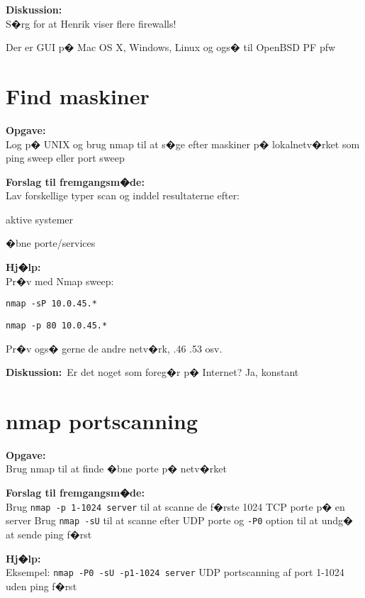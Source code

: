 \documentclass[a4paper,11pt,notitlepage]{oevelser}
\begin{document}
{\bfseries Diskussion:}\\
S�rg for at Henrik viser flere firewalls!

Der er GUI p� Mac OS X, Windows, Linux og ogs� til OpenBSD PF pfw




\chapter{Find maskiner}
\label{ex:nmap-sweep}

{\bfseries Opgave:}\\
Log p� UNIX og brug nmap til at s�ge efter maskiner p� lokalnetv�rket som ping sweep eller port sweep

{\bfseries Forslag til fremgangsm�de:}\\
Lav forskellige typer scan og
inddel resultaterne efter:
\begin{list2}
\item aktive systemer
\item �bne porte/services
\end{list2}

{\bfseries Hj�lp:} \\
Pr�v med Nmap sweep:
\begin{list1}
\item \verb+nmap -sP 10.0.45.*+
\item \verb+nmap -p 80 10.0.45.*+
\item Pr�v ogs� gerne de andre netv�rk, .46 .53 osv.
\end{list1}

{\bfseries Diskussion:}\
Er det noget som foreg�r p� Internet? Ja, konstant


\chapter{nmap portscanning}
\label{ex:nmap-portscan}

{\bfseries Opgave:} \\
Brug nmap til at finde �bne porte p� netv�rket

{\bfseries Forslag til fremgangsm�de:}\\
Brug \verb+nmap -p 1-1024 server+ til at scanne de f�rste 1024 TCP
porte p� en server
Brug \verb+nmap -sU+ til at scanne efter UDP porte og \verb+-P0+
option til at undg� at sende ping f�rst

{\bfseries Hj�lp:} \\
Eksempel: \verb+nmap -P0 -sU -p1-1024 server+ UDP portscanning af port
1-1024 uden ping f�rst
\end{document}
